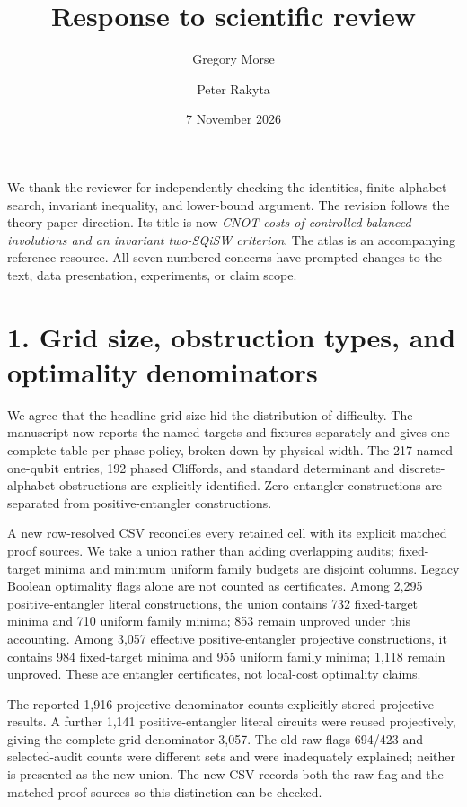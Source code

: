 \documentclass[11pt]{article}
\title{Response to scientific review}
\author{Gregory Morse \and Peter Rakyta}\date{7 November 2026}
\begin{document}
\maketitle
We thank the reviewer for independently checking the identities, finite-alphabet
search, invariant inequality, and lower-bound argument. The revision follows
the theory-paper direction. Its title is now \emph{CNOT costs of controlled
balanced involutions and an invariant two-SQiSW criterion}. The atlas is an
accompanying reference resource. All seven numbered concerns have prompted
changes to the text, data presentation, experiments, or claim scope.

\section*{1. Grid size, obstruction types, and optimality denominators}
We agree that the headline grid size hid the distribution of difficulty.
The manuscript now reports the named targets and fixtures separately and
gives one complete table per phase policy, broken down by physical width.
The 217 named one-qubit entries, 192 phased Cliffords, and standard determinant
and discrete-alphabet obstructions are explicitly identified. Zero-entangler
constructions are separated from positive-entangler constructions.

A new row-resolved CSV reconciles every retained cell with its explicit
matched proof sources. We take a union rather than adding overlapping audits;
fixed-target minima and minimum uniform family budgets are disjoint columns.
Legacy Boolean optimality flags alone are not counted as certificates.
Among 2,295 positive-entangler literal constructions, the union contains
732 fixed-target minima and 710 uniform family minima; 853 remain unproved
under this accounting. Among 3,057 effective positive-entangler projective
constructions, it contains 984 fixed-target minima and 955 uniform family
minima; 1,118 remain unproved. These are entangler certificates, not local-cost
optimality claims.

The reported 1,916 projective denominator counts explicitly stored projective
results. A further 1,141 positive-entangler literal circuits were reused
projectively, giving the complete-grid denominator 3,057. The old raw flags
694/423 and selected-audit counts were different sets and were inadequately
explained; neither is presented as the new union. The new CSV records both
the raw flag and the matched proof sources so this distinction can be checked.
\end{document}
